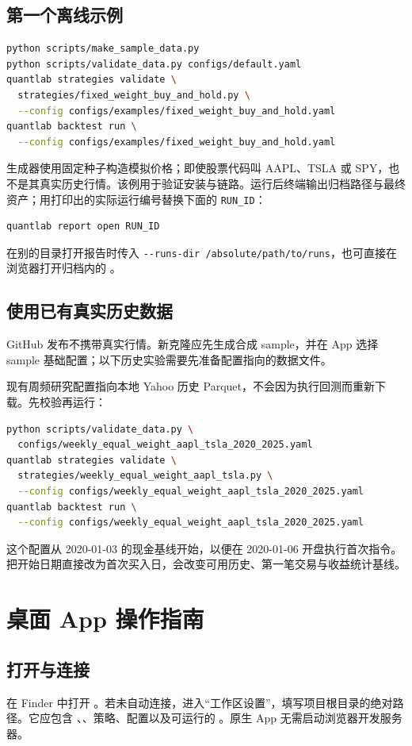 \documentclass[UTF8,fontset=none,11pt]{ctexart}
\newcommand{\code}[1]{\nolinkurl{#1}}
\let\originalsection\section
\renewcommand{\section}{\Needspace{9\baselineskip}\originalsection}
\let\originalsubsection\subsection
\renewcommand{\subsection}{\Needspace{8\baselineskip}\originalsubsection}
\begin{document}
\subsection{第一个离线示例}
\begin{lstlisting}[language=bash]
python scripts/make_sample_data.py
python scripts/validate_data.py configs/default.yaml
quantlab strategies validate \
  strategies/fixed_weight_buy_and_hold.py \
  --config configs/examples/fixed_weight_buy_and_hold.yaml
quantlab backtest run \
  --config configs/examples/fixed_weight_buy_and_hold.yaml
\end{lstlisting}
生成器使用固定种子构造模拟价格；即使股票代码叫 AAPL、TSLA 或 SPY，也不是其真实历史行情。该例用于验证安装与链路。运行后终端输出归档路径与最终资产；用打印出的实际运行编号替换下面的 \code{RUN_ID}：
\begin{lstlisting}[language=bash]
quantlab report open RUN_ID
\end{lstlisting}
在别的目录打开报告时传入 \code{--runs-dir /absolute/path/to/runs}，也可直接在浏览器打开归档内的 。

\subsection{使用已有真实历史数据}
GitHub 发布不携带真实行情。新克隆应先生成合成 sample，并在 App 选择 sample 基础配置；以下历史实验需要先准备配置指向的数据文件。

现有周频研究配置指向本地 Yahoo 历史 Parquet，不会因为执行回测而重新下载。先校验再运行：
\begin{lstlisting}[language=bash]
python scripts/validate_data.py \
  configs/weekly_equal_weight_aapl_tsla_2020_2025.yaml
quantlab strategies validate \
  strategies/weekly_equal_weight_aapl_tsla.py \
  --config configs/weekly_equal_weight_aapl_tsla_2020_2025.yaml
quantlab backtest run \
  --config configs/weekly_equal_weight_aapl_tsla_2020_2025.yaml
\end{lstlisting}
这个配置从 2020-01-03 的现金基线开始，以便在 2020-01-06 开盘执行首次指令。把开始日期直接改为首次买入日，会改变可用历史、第一笔交易与收益统计基线。

\section{桌面 App 操作指南}
\subsection{打开与连接}
在 Finder 中打开 。若未自动连接，进入“工作区设置”，填写项目根目录的绝对路径。它应包含 、、策略、配置以及可运行的 。原生 App 无需启动浏览器开发服务器。
\end{document}
